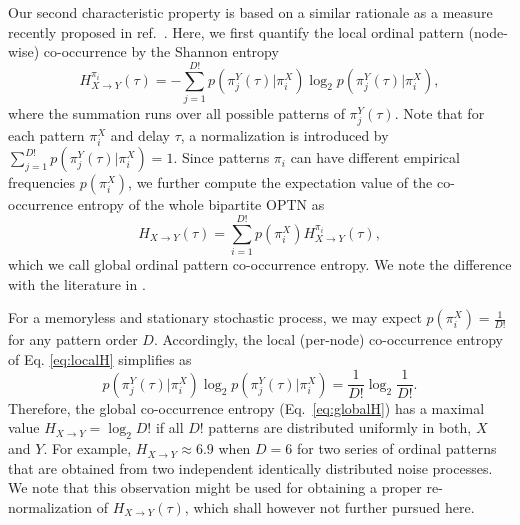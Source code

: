 \documentclass[12pt,aip,cha,reprint,nofootinbib]{revtex4-1}
\begin{document}
Our second characteristic property is based on a similar rationale as a measure recently proposed in ref.~\cite{McCullough2017b}. Here, we first quantify the local ordinal pattern (node-wise) co-occurrence by the Shannon entropy
\begin{equation} \label{eq:localH}
H_{X \to Y}^{\pi_i}(\tau) = - \sum_{j=1}^{D!} p(\pi_{j}^{Y}(\tau) | \pi_i^{X}) \log_2 p(\pi_{j}^{Y}(\tau) | \pi_i^{X}), 
\end{equation}
where the summation runs over all possible patterns of $\pi_j^{Y}(\tau)$. Note that for each pattern $\pi_i^{X}$ and delay $\tau$, a normalization is introduced by $\sum_{j=1}^{D!} p(\pi_{j}^{Y}(\tau) | \pi_i^{X}) = 1$. Since patterns $\pi_i$ can have different empirical frequencies $p(\pi_i^{X})$, we further compute the expectation value of the co-occurrence entropy of the whole bipartite OPTN as 
\begin{equation}  \label{eq:globalH}
H_{X \to Y}(\tau) = \sum_{i=1}^{D!} p(\pi_i^{X}) H_{X \to Y}^{\pi_i}(\tau), 
\end{equation}
which we call global ordinal pattern co-occurrence entropy. {\color{red} We note the difference with the literature in \cite{LiNI2010}. }

For a memoryless and stationary stochastic process, we may expect $p(\pi_i^{X} )= \frac{1}{D!}$ for any pattern order $D$. Accordingly, the local (per-node) co-occurrence entropy of Eq. \eqref{eq:localH} simplifies as 
\begin{equation}
p(\pi_{j}^{Y}(\tau) | \pi_i^{X}) \log_2 p(\pi_{j}^{Y}(\tau) | \pi_i^{X}) = \frac{1}{D!} \log_2 \frac{1}{D!}. 
\end{equation}
Therefore, the global co-occurrence entropy (Eq.~\eqref{eq:globalH}) has a maximal value $H_{X \to Y} = \log_2 D!$ if all $D!$ patterns are distributed uniformly in both, $X$ and $Y$. For example, $H_{X \to Y} \approx 6.9$ when $D = 6$ for two series of ordinal patterns that are obtained from two independent identically distributed noise processes. We note that this observation might be used for obtaining a proper re-normalization of $H_{X \to Y}(\tau)$, which shall however not further pursued here.
\end{document}
